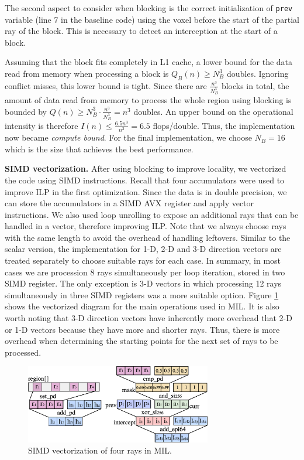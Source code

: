 \documentclass[letterpaper]{article}
\newcommand{\mypar}[1]{{\bf #1.}}
\begin{document}
The second aspect to consider when blocking is the correct initialization of \texttt{prev} variable (line 7 in the baseline code) using the voxel before the start of the partial ray of the block. This is necessary to detect an interception at the start of a block. 

Assuming that the block fits completely in L1 cache, a lower bound for the data read from memory when processing a block is $Q_B(n) \geq N_B^3$ doubles. Ignoring conflict misses, this lower bound is tight. Since there are $\frac{n^3}{N_B^3}$ blocks in total, the amount of data read from memory to process the whole region using blocking is bounded by $Q(n) \geq N_B^3 \cdot \frac{n^3}{N_B^3} = n^3$ doubles. An upper bound on the operational intensity is therefore $I(n) \leq \frac{6.5n^3}{n^3} = 6.5$ flops/double. Thus, the implementation now became \textit{compute bound}. For the final implementation, we choose $N_B = 16$ which is the size that achieves the best performance.

\mypar{SIMD vectorization}
After using blocking to improve locality, we vectorized the code using SIMD instructions. Recall that four accumulators were used to improve ILP in the first optimization. Since the data is in double precision, we can store the accumulators in a SIMD AVX register and apply vector instructions. We also used loop unrolling to expose an additional rays that can be handled in a vector, therefore improving ILP. Note that we always choose rays with the same length to avoid the overhead of handling leftovers. Similar to the scalar version, the implementation for 1-D, 2-D and 3-D direction vectors are treated separately to choose suitable rays for each case. In summary, in most cases we are procession 8 rays simultaneously per loop iteration, stored in two SIMD register. The only exception is 3-D vectors in which processing 12 rays simultaneously in three SIMD registers was a more suitable option. 
Figure \ref{fig:simd_mil} shows the vectorized diagram for the main operations used in MIL.
It is also worth noting that 3-D direction vectors have inherently more overhead that 2-D or 1-D vectors because they have more and shorter rays. Thus, there is more overhead when determining the starting points for the next set of rays to be processed.

\begin{figure}[H]
    \centering
    \includegraphics[width=3.2in]{figs/simd_mil2.eps}
    \caption{SIMD vectorization of four rays in MIL.}
    \label{fig:simd_mil}
\end{figure}
\end{document}
